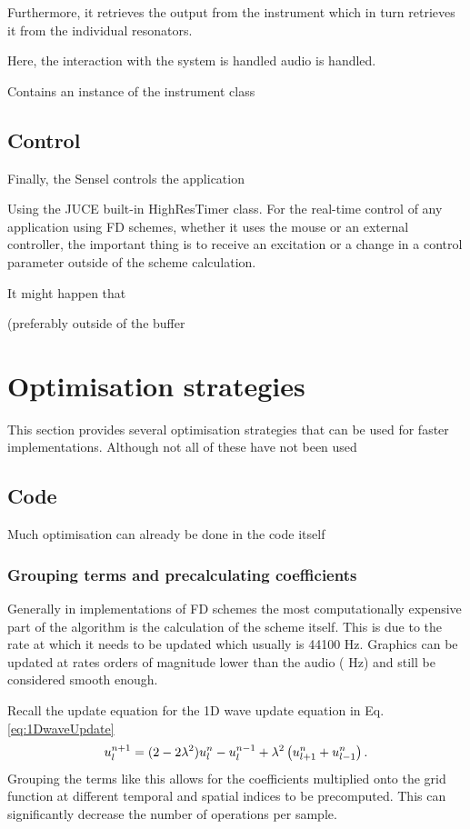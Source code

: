 Furthermore, it retrieves the output from the instrument which in turn retrieves it from the individual resonators.


Here, the interaction with the system is handled audio is handled.

Contains an instance of the instrument class


\subsection{Control}
Finally, the Sensel controls the application

Using the JUCE built-in HighResTimer class. For the real-time control of any application using FD schemes, whether it uses the mouse or an external controller, the important thing is to receive an excitation or a change in a control parameter outside of the scheme calculation.

It might happen that 

(preferably outside of the buffer



\section{Optimisation strategies}
This section provides several optimisation strategies that can be used for faster implementations. Although not all of these have not been used

\subsection{Code}
Much optimisation can already be done in the code itself 


\subsubsection{Grouping terms and precalculating coefficients}
Generally in implementations of FD schemes the most computationally expensive part of the algorithm is the calculation of the scheme itself. This is due to the rate at which it needs to be updated which usually is 44100 Hz. Graphics can be updated at rates orders of magnitude lower than the audio ( Hz) and still be considered smooth enough.

Recall the update equation for the 1D wave update equation in Eq. \eqref{eq:1DwaveUpdate}
\begin{equation*}
    u_l^{n+1} = (2 - 2 \lambda^2) u_l^n - u_l^{n-1} + \lambda^2\left(u_{l+1}^n + u_{l-1}^n\right).
\end{equation*}
Grouping the terms like this allows for the coefficients multiplied onto the grid function at different temporal and spatial indices to be precomputed. This can significantly decrease the number of operations per sample.

